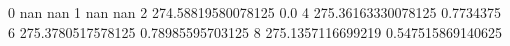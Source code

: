 0 nan nan
1 nan nan
2 274.58819580078125 0.0
4 275.36163330078125 0.7734375
6 275.3780517578125 0.78985595703125
8 275.1357116699219 0.547515869140625

